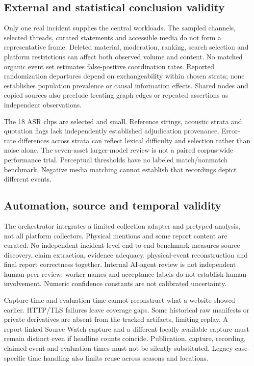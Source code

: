 \subsection{External and statistical conclusion validity}
Only one real incident supplies the central workloads. The sampled channels, selected threads, curated statements and accessible media do not form a representative frame. Deleted material, moderation, ranking, search selection and platform restrictions can affect both observed volume and content. No matched organic event set estimates false-positive coordination rates. Reported randomization departures depend on exchangeability within chosen strata; none establishes population prevalence or causal information effects. Shared nodes and copied sources also preclude treating graph edges or repeated assertions as independent observations.

The 18 ASR clips are selected and small. Reference strings, acoustic strata and quotation flags lack independently established adjudication provenance. Error-rate differences across strata can reflect lexical difficulty and selection rather than noise alone. The seven-asset larger-model review is not a paired corpus-wide performance trial. Perceptual thresholds have no labeled match/nonmatch benchmark. Negative media matching cannot establish that recordings depict different events.

\subsection{Automation, source and temporal validity}
The orchestrator integrates a limited collection adapter and pretyped analysis, not all platform collectors. Physical mentions and some report content are curated. No independent incident-level end-to-end benchmark measures source discovery, claim extraction, evidence adequacy, physical-event reconstruction and final report correctness together. Internal AI-agent review is not independent human peer review; worker names and acceptance labels do not establish human involvement. Numeric confidence constants are not calibrated uncertainty.

Capture time and evaluation time cannot reconstruct what a website showed earlier. HTTP/TLS failures leave coverage gaps. Some historical raw manifests or private derivatives are absent from the tracked artifacts, limiting replay. A report-linked Source Watch capture and a different locally available capture must remain distinct even if headline counts coincide. Publication, capture, recording, claimed event and evaluation times must not be silently substituted. Legacy case-specific time handling also limits reuse across seasons and locations.

